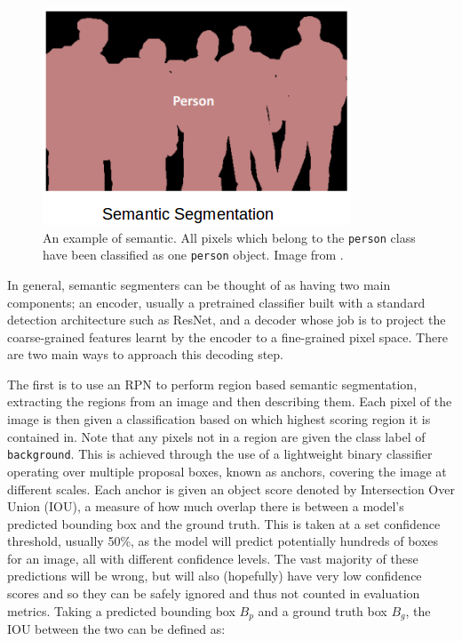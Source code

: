\begin{figure}
	\begin{center}
		\includegraphics[scale=0.5]{Chapter2/figs/semantic_segmentation.png}
	\end{center}
	\caption[An example of semantic segmentation.]{An example of semantic. All pixels which belong to the \texttt{person} class have been classified as one \texttt{person} object. Image from \cite{sharma_image_2019}.}
	\label{fig:semantic-eg}
\end{figure}

In general, semantic segmenters can be thought of as having two main components; an encoder, usually a pretrained classifier built with a standard detection architecture such as ResNet, and a decoder whose job is to project the coarse-grained features learnt by the encoder to a fine-grained pixel space. There are two main ways to approach this decoding step.

The first is to use an RPN to perform region based semantic segmentation, extracting the regions from an image and then describing them. Each pixel of the image is then given a classification based on which highest scoring region it is contained in. Note that any pixels not in a region are given the class label of \texttt{background}. This is achieved through the use of a lightweight binary classifier operating over multiple proposal boxes, known as anchors, covering the image at different scales. Each anchor is given an object score denoted by Intersection Over Union (IOU), a measure of how much overlap there is between a model's predicted bounding box and the ground truth. This is taken at a set confidence threshold, usually 50\%, as the model will predict potentially hundreds of boxes for an image, all with different confidence levels. The vast majority of these predictions will be wrong, but will also (hopefully) have very low confidence scores and so they can be safely ignored and thus not counted in evaluation metrics. Taking a predicted bounding box $B_p$ and a ground truth box $B_g$, the IOU between the two can be defined as:

